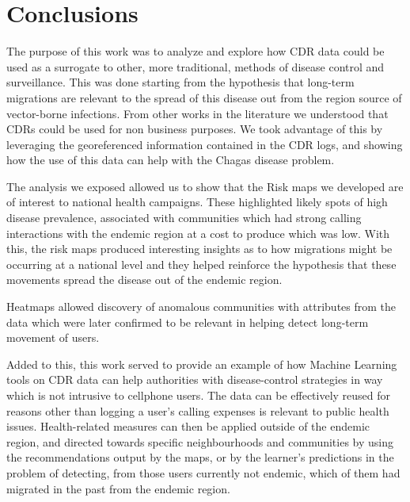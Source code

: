 \chapter{Conclusions}\label{ch:conclusions}


The purpose of this work was to analyze and explore how CDR data could be used as a surrogate to other, more traditional, methods of disease control and surveillance.
This was done starting from the hypothesis that long-term migrations are relevant to the spread of this disease out from the region source of vector-borne infections.
From other works in the literature we understood that CDRs could be used for non business purposes.
We took advantage of this by leveraging the georeferenced information contained in the CDR logs, and showing how the use of this data can help with the Chagas disease problem.


The analysis we exposed allowed us to show that the Risk maps we developed are of interest to national health campaigns.
These highlighted likely spots of high disease prevalence, associated with communities which had strong calling interactions with the endemic region at a cost to produce which was low.
With this, the risk maps produced interesting insights as to how migrations might be occurring at a national level and they helped reinforce the hypothesis that these movements spread the disease out of the endemic region.

Heatmaps allowed discovery of anomalous communities with attributes from the data which were later confirmed to be relevant in helping detect long-term movement of users.

Added to this, this work served to provide an example of how Machine Learning tools on CDR data can help authorities with disease-control strategies in way which is not intrusive to cellphone users.
The data can be effectively reused for reasons other than logging a user's calling expenses is relevant to public health issues.
Health-related measures can then be applied outside of the endemic region, and directed towards specific neighbourhoods and communities by using the recommendations output by the maps, or by the learner's predictions in the problem of detecting, from those users currently not endemic, which of them had migrated in the past from the endemic region.


